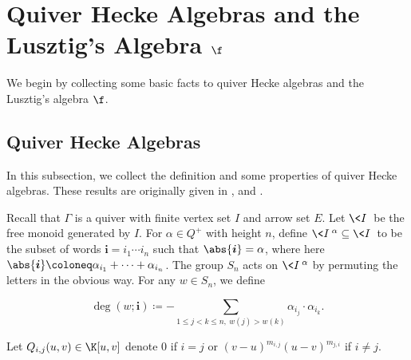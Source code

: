\section{Quiver Hecke Algebras and the Lusztig's Algebra \texorpdfstring{$\f$}{f}}

We begin by collecting some basic facts to quiver Hecke algebras
and the Lusztig's algebra $\f$.

\subsection{Quiver Hecke Algebras}

In this subsection, we collect the definition and some properties of quiver Hecke algebras.
These results are originally given in \cite{KL1}, \cite{KL2} and \cite{R}.

Recall that $\Gamma$ is a quiver with finite vertex set $I$ and arrow set $E$.
Let $\<I\>$ be the free monoid generated by $I$. 
For $\alpha\in Q^+$ with height $n$,
define $\<I\>^\alpha \subseteq \<I\>$ to be the subset of words
$\boldsymbol{i} = i_1\cdots i_n$ such that $\abs{\boldsymbol{i}} = \alpha$,
where here $\abs{\boldsymbol{i}} \coloneq   \alpha_{i_1}+ \cdots+ \alpha_{i_n}$.
The group $S_n$ acts on $\<I\>^\alpha$ by permuting the letters
in the obvious way. For any $w\in S_n$, we define 

\begin{equation}
    \label{deg-w-i}\deg(w;\boldsymbol{i}) \coloneq  -\sum_{1\le j<k\le n,\ w(j)>w(k)}
    \alpha_{i_j}\cdot\alpha_{i_k}.
\end{equation}

Let $Q_{i,j}(u,v)\in \K[u,v]$
denote $0$ if $i = j$ or $(v-u)^{m_{i,j}}(u-v)^{m_{j,i}}$ if $i\ne j$.

